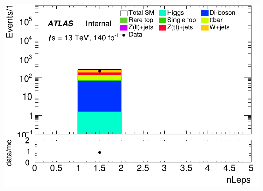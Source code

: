 \documentclass[usenames,dvipsnames]{beamer}
\begin{document}
\begin{frame}
\begin{minipage}{0.32\textwidth}
        \includegraphics[width=\textwidth]{graphics/LHH_met/LHH_met_nLeps.png}
    \end{minipage}
    
    \vspace{0.5cm} %


\end{frame}
\end{document}
